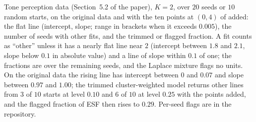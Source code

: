 \begin{table}[htbp]
\centering
\scriptsize
\caption{Tone perception data (Section~5.2 of the paper), $K=2$, over $20$ seeds or $10$ random
starts, on the original data and with the ten points at $(0,4)$ of \citet{bai2012robust} added:
the flat line (intercept, slope; range in brackets when it exceeds $0.005$), the number of seeds
with other fits, and the trimmed or flagged fraction. A fit counts as ``other'' unless it has a
nearly flat line near $2$ (intercept between $1.8$ and $2.1$, slope below $0.1$ in absolute
value) and a line of slope within $0.1$ of one; the fractions are over the remaining seeds, and
the Laplace mixture flags no units. On the original data the rising line has intercept between
$0$ and $0.07$ and slope between $0.97$ and $1.00$; the trimmed cluster-weighted model returns
other lines from $3$ of $10$ starts at level $0.10$ and $6$ of $10$ at level $0.25$ with the
points added, and the flagged fraction of ESF then rises to $0.29$. Per-seed flags are
in the repository.}
\label{tab:tone}
\resizebox{\textwidth}{!}{}
\end{table}

